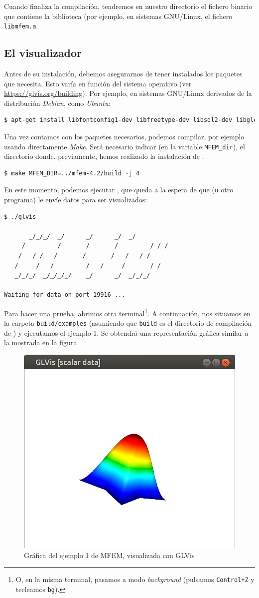 Cuando finaliza la compilación, tendremos en nuestro directorio el fichero binario que contiene la biblioteca \mfem (por ejemplo, en sistemas GNU/Linux, el fichero \verb|libmfem.a|.


\subsection{El visualizador \glvis}
\label{sec:glvis}

Antes de su instalación, debemos asegurarnos de tener instalados los
paquetes que \glvis necesita. Esto varía en función del sistema
operativo (ver \url{https://glvis.org/building}).
Por ejemplo, en sistemas GNU/Linux derivados de la distribución \textit{Debian}, como \textit{Ubuntu}:
\begin{lstlisting}[language=sh]
$ apt-get install libfontconfig1-dev libfreetype-dev libsdl2-dev libglew-dev libglm-dev libpng-dev
\end{lstlisting}

Una vez contamos con los paquetes necesarios, podemos compilar, por
ejemplo usando directamente \textit{Make}. Será necesario indicar (en
la variable \verb|MFEM_dir|), el directorio donde, previamente, hemos
realizado la instalación de \mfem.
\begin{lstlisting}[language=sh]
$ make MFEM_DIR=../mfem-4.2/build -j 4
\end{lstlisting}

En este momento, podemos ejecutar \glvis, que queda a la espera de que
\mfem (u otro programa) le envíe datos para ser visualizados:
\begin{lstlisting}
$ ./glvis

       _/_/_/  _/      _/      _/  _/
    _/        _/      _/      _/        _/_/_/
   _/  _/_/  _/      _/      _/  _/  _/_/
  _/    _/  _/        _/  _/    _/      _/_/
   _/_/_/  _/_/_/_/    _/      _/  _/_/_/

Waiting for data on port 19916 ...
\end{lstlisting}

Para hacer una prueba, abrimos otra terminal\footnote{O, en la misma
  terminal, pasamos \glvis a modo \textit{background} (pulsamos
  \texttt{Control+Z} y tecleamos \texttt{bg}).}. A continuación, nos
situamos en la carpeta \texttt{build/examples} (asumiendo que
\texttt{build} es el directorio de compilación de \mfem) y ejecutamos el ejemplo 1. Se obtendrá una representación gráfica similar a la mostrada en la figura

\begin{figure}
  \centering
  \includegraphics[width=0.3\linewidth]{img/ex1-glvis}
  \caption{Gráfica del ejemplo 1 de MFEM, visualizada con GLVis}
  \label{fig:ex1-glvis}
\end{figure}

